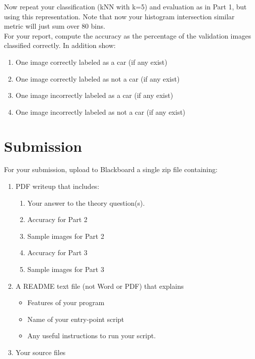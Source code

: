 \documentclass[12pt]{article}
\begin{document}
\noindent
Now repeat your classification (kNN with k=5) and evaluation as in Part 1, but using this representation.  Note that now your histogram intersection similar metric will just sum over 80 bins.\\

\noindent
For your report, compute the accuracy as the percentage of the validation images classified correctly.  In addition show:

\begin{enumerate}
\item One image correctly labeled as a car (if any exist)
\item One image correctly labeled as not a car (if any exist)
\item One image incorrectly labeled as a car (if any exist)
\item One image incorrectly labeled as not a car (if any exist)
\end{enumerate}


\newpage
\section*{Submission}
For your submission, upload to Blackboard a single zip file containing:

\begin{enumerate}
\item PDF writeup that includes:
\begin{enumerate}
\item Your answer to the theory question(s).
\item Accuracy for Part 2
\item Sample images for Part 2
\item Accuracy for Part 3
\item Sample images for Part 3
\end{enumerate}
\item A README text file (not Word or PDF) that explains
\begin{itemize}
\item Features of your program
\item Name of your entry-point script
\item Any useful instructions to run your script.
\end{itemize}
\item Your source files
\end{enumerate}
\end{document}
